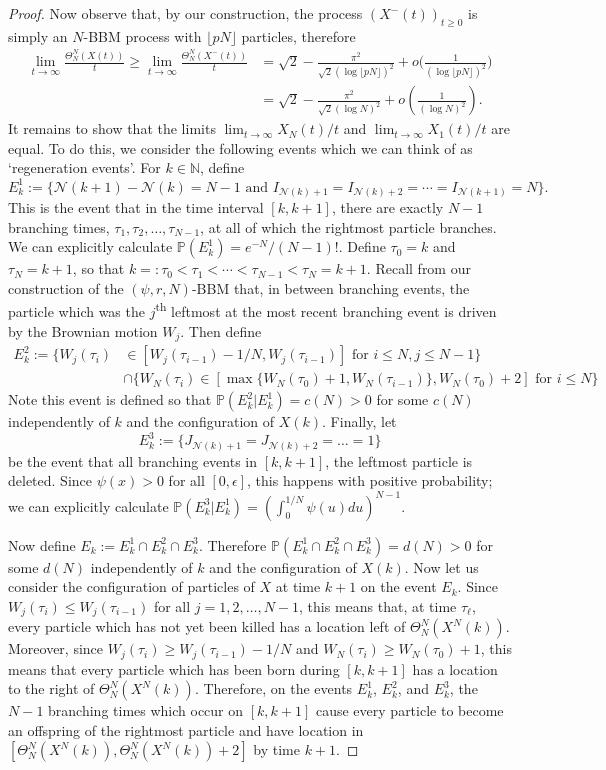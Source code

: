 \documentclass{article}
\newcommand{\B}[1]{\mathbb{#1}}
\newcommand{\C}[1]{\mathcal{#1}}
\begin{document}
\begin{proof}
    Now observe that, by our construction, the process $(X^-(t))_{t\geq 0}$ is simply an $N$-BBM process with $\lfloor pN\rfloor$ particles, therefore
    \begin{align*}
       \lim_{t\to\infty}\frac{\Theta^N_N(X(t))}{t}\geq \lim_{t\to\infty}\frac{\Theta^N_N(X^-(t))}{t} &= \sqrt{2}-\frac{\pi^2}{\sqrt{2}(\log \lfloor pN\rfloor)^2}+o\Big(\frac{1}{(\log \lfloor pN\rfloor)^2}\Big) \\
        &= \sqrt{2}-\frac{\pi^2}{\sqrt{2}(\log N)^2}+o\left(\frac{1}{(\log N)^2}\right).
    \end{align*}
    It remains to show that the limits $\lim_{t\to\infty}X_N(t)/t$ and $\lim_{t\to\infty}X_1(t)/t$ are equal. To do this, we consider the following events which we can think of as `regeneration events'. For $k\in \B{N}$, define
    $$E^1_k:=\{\C{N}(k+1)-\C{N}(k)=N-1\text{ and }I_{\C{N}(k)+1}=I_{\C{N}(k)+2}=\cdots=I_{\C{N}(k+1)}=N\}.$$
    This is the event that in the time interval $[k,k+1]$, there are exactly $N-1$ branching times, $\tau_1,\tau_2,\ldots,\tau_{N-1}$, at all of which the rightmost particle branches. We can explicitly calculate $\B{P}(E_k^1)=e^{-N}/(N-1)!$. Define $\tau_0=k$ and $\tau_N=k+1$, so that $k=:\tau_0<\tau_1<\cdots<\tau_{N-1}<\tau_N=k+1$. Recall from our construction of the $(\psi,r,N)$-BBM that, in between branching events, the particle which was the $j$\textsuperscript{th} leftmost at the most recent branching event is driven by the Brownian motion $W_j$. Then define
    \begin{align*}E^2_k:=\{W_j(\tau_{i})&\in [W_j(\tau_{i-1})-1/N,W_j(\tau_{i-1})]\text{ for }i\leq N, j\leq N-1\}\\&\cap\{W_N(\tau_i)\in[\max\{W_N(\tau_0)+1,W_N(\tau_{i-1})\},W_N(\tau_0)+2]\text{ for }i\leq N\}\end{align*}
    Note this event is defined so that $\B{P}(E^2_k|E^1_k)=c(N)>0$ for some $c(N)$ independently of $k$ and the configuration of $X(k)$. Finally, let $$E^3_k:=\{J_{\C{N}(k)+1}=J_{\C{N}(k)+2}=\ldots=1\}$$ be the event that all branching events in $[k,k+1]$, the leftmost particle is deleted. Since $\psi(x)>0$ for all $[0,\epsilon]$, this happens with positive probability; we can explicitly calculate $\B{P}(E^3_k|E^1_k)=(\int_0^{1/N}\psi(u)du)^{N-1}$. 
    
    Now define $E_k:=E_k^1\cap E_k^2\cap E_k^3$. Therefore $\B{P}(E^1_k\cap E^2_k \cap E_k^3)=d(N)>0$ for some $d(N)$ independently of $k$ and the configuration of $X(k)$. Now let us consider the configuration of particles of $X$ at time $k+1$ on the event $E_k$. Since $W_j(\tau_i)\leq W_j(\tau_{i-1})$ for all $j=1,2,\ldots,N-1$, this means that, at time $\tau_\ell$, every particle which has not yet been killed has a location left of $\Theta^N_N(X^N(k))$. Moreover, since $W_j(\tau_i)\geq W_j(\tau_{i-1})-1/N$ and $W_N(\tau_i)\geq W_N(\tau_0)+1$, this means that every particle which has been born during $[k,k+1]$ has a location to the right of $\Theta^N_N(X^N(k))$. Therefore, on the events $E_k^1$, $E_k^2$, and $E_k^3$, the $N-1$ branching times which occur on $[k,k+1]$ cause every particle to become an offspring of the rightmost particle and have location in $[\Theta^N_N(X^N(k)),\Theta^N_N(X^N(k))+2]$ by time $k+1$.
    

\end{proof}
\end{document}
